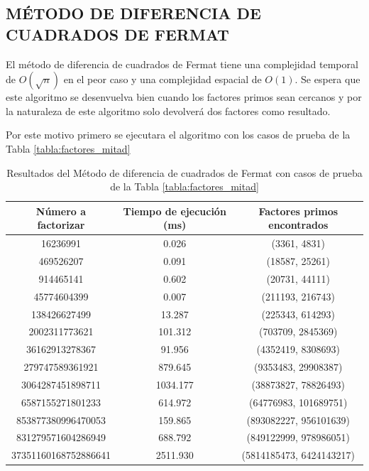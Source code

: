     \subsection{MÉTODO DE DIFERENCIA DE CUADRADOS DE FERMAT}
    El método de diferencia de cuadrados de Fermat tiene una complejidad temporal de $O(\sqrt{n})$ en el peor caso y una complejidad espacial de $O(1)$. Se espera que este algoritmo se desenvuelva bien cuando los factores primos sean cercanos y por la naturaleza de este algoritmo solo devolverá dos factores como resultado.

    Por este motivo primero se ejecutara el algoritmo con los casos de prueba de la Tabla \ref{tabla:factores_mitad}

    \begin{table}[H]
        \centering
        \begin{tabular}{ccc}
        \toprule
        Número a factorizar & Tiempo de ejecución (ms) & Factores primos encontrados\\
        \midrule
        16236991 & 0.026 & (3361, 4831)\\
        469526207 & 0.091 & (18587, 25261)\\
        914465141 & 0.602 & (20731, 44111)\\
        45774604399 & 0.007 & (211193, 216743)\\
        138426627499 & 13.287 & (225343, 614293)\\
        2002311773621 & 101.312 & (703709, 2845369)\\
        36162913278367 & 91.956 & (4352419, 8308693)\\
        279747589361921 & 879.645 & (9353483, 29908387)\\
        3064287451898711 & 1034.177 & (38873827, 78826493)\\
        6587155271801233 & 614.972 & (64776983, 101689751)\\
        853877380996470053 & 159.865 & (893082227, 956101639)\\
        831279571604286949 & 688.792 & (849122999, 978986051)\\
        37351160168752886641 & 2511.930 & (5814185473, 6424143217)\\
        \bottomrule
        \end{tabular}
        \caption{Resultados del Método de diferencia de cuadrados de Fermat con casos de prueba de la Tabla \ref{tabla:factores_mitad}}
        \label{tab:res-fermat-mitad}
    \end{table}

